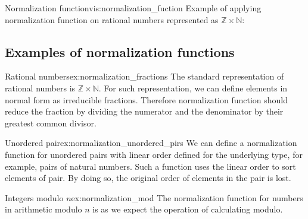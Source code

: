 \begin{vis}[B]{Normalization function}{vis:normalization_fuction}
Example of applying normalization function on rational numbers represented as $\mathbb{Z} \times \mathbb{N}$:
\begin{center}
\end{center}
\end{vis}

\subsection{Examples of normalization functions}
\begin{example}{Rational numbers}{ex:normalization_fractions}
The standard representation of rational numbers is $\mathbb{Z} \times \mathbb{N}$. For such representation, we can define elements in normal form as irreducible fractions. Therefore normalization function should reduce the fraction by dividing the numerator and the denominator by their greatest common divisor.
\end{example}
\begin{example}{Unordered pair}{ex:normalization_unordered_pirs}
We can define a normalization function for unordered pairs with linear order defined for the underlying type, for example, pairs of natural numbers. Such a function uses the linear order to sort elements of pair. By doing so, the original order of elements in the pair is lost.
\end{example}
\begin{example}{Integers modulo $n$}{ex:normalization_mod}
The normalization function for numbers in arithmetic modulo $n$ is as we expect the operation of calculating modulo.
\end{example}


